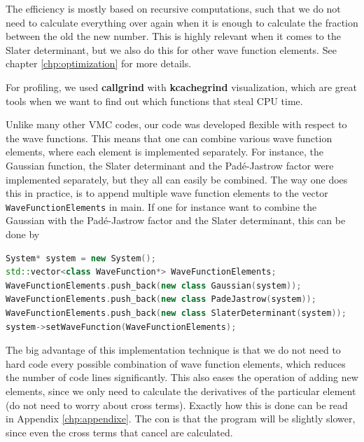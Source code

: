 The efficiency is mostly based on recursive computations, such that we do not need to calculate everything over again when it is enough to calculate the fraction between the old the new number. This is highly relevant when it comes to the Slater determinant, but we also do this for other wave function elements. See chapter \eqref{chp:optimization} for more details. 

For profiling, we used \textbf{callgrind} with \textbf{kcachegrind} visualization, which are great tools when we want to find out which functions that steal CPU time. 

Unlike many other VMC codes, our code was developed flexible with respect to the wave functions. This means that one can combine various wave function elements, where each element is implemented separately. For instance, the Gaussian function, the Slater determinant and the Padé-Jastrow factor were implemented separately, but they all can easily be combined. The way one does this in practice, is to append multiple wave function elements to the vector \texttt{WaveFunctionElements} in main. If one for instance want to combine the Gaussian with the Padé-Jastrow factor and the Slater determinant, this can be done by

\lstset{basicstyle=\scriptsize}
\begin{lstlisting}[language=c++,caption={\texttt{main.cpp}}]
System* system = new System();
std::vector<class WaveFunction*> WaveFunctionElements;
WaveFunctionElements.push_back(new class Gaussian(system));
WaveFunctionElements.push_back(new class PadeJastrow(system));
WaveFunctionElements.push_back(new class SlaterDeterminant(system));
system->setWaveFunction(WaveFunctionElements);
\end{lstlisting}

The big advantage of this implementation technique is that we do not need to hard code every possible combination of wave function elements, which reduces the number of code lines significantly. This also eases the operation of adding new elements, since we only need to calculate the derivatives of the particular element (do not need to worry about cross terms). Exactly how this is done can be read in Appendix \ref{chp:appendixe}. The con is that the program will be slightly slower, since even the cross terms that cancel are calculated.

